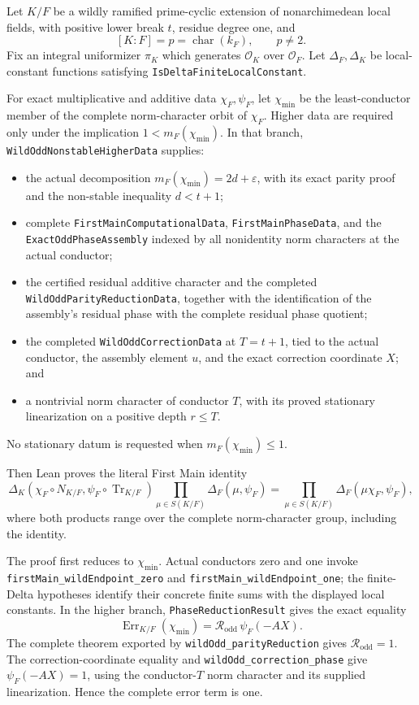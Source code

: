 \begin{theorem}\label{mod:cases-wildodd-main}
Let \(K/F\) be a wildly ramified prime-cyclic extension of
nonarchimedean local fields, with positive lower break \(t\), residue degree
one, and
\[
 [K:F]=p=\operatorname{char}(k_F),\qquad p\ne2.
\]
Fix an integral uniformizer \(\pi_K\) which generates
\(\mathcal O_K\) over \(\mathcal O_F\).  Let
\(\Delta_F,\Delta_K\) be local-constant functions satisfying
\texttt{IsDeltaFiniteLocalConstant}.

For exact multiplicative and additive data \(\chi_F,\psi_F\), let
\(\chi_{\min}\) be the least-conductor member of the complete
norm-character orbit of \(\chi_F\).  Higher data are required only under the
implication \(1<m_F(\chi_{\min})\).  In that branch,
\texttt{WildOddNonstableHigherData} supplies:
\begin{itemize}
\item the actual decomposition
  \(m_F(\chi_{\min})=2d+\varepsilon\), with its exact parity proof and the
  non-stable inequality \(d<t+1\);
\item complete \texttt{FirstMainComputationalData},
  \texttt{FirstMainPhaseData}, and the \texttt{ExactOddPhaseAssembly}
  indexed by all nonidentity norm characters at the actual conductor;
\item the certified residual additive character and the completed
  \texttt{WildOddParityReductionData}, together with the identification of
  the assembly's residual phase with the complete residual phase quotient;
\item the completed \texttt{WildOddCorrectionData} at \(T=t+1\), tied to
  the actual conductor, the assembly element \(u\), and the exact correction
  coordinate \(X\); and
\item a nontrivial norm character of conductor \(T\), with its proved
  stationary linearization on a positive depth \(r\le T\).
\end{itemize}
No stationary datum is requested when \(m_F(\chi_{\min})\le1\).

Then Lean proves the literal First Main identity
\[
 \Delta_K(\chi_F\circ N_{K/F},\psi_F\circ\operatorname{Tr}_{K/F})
 \prod_{\mu\in S(K/F)}\Delta_F(\mu,\psi_F)
 =
 \prod_{\mu\in S(K/F)}\Delta_F(\mu\chi_F,\psi_F),
\]
where both products range over the complete norm-character group, including
the identity.

The proof first reduces to \(\chi_{\min}\).  Actual conductors zero and one
invoke \texttt{firstMain\_wildEndpoint\_zero} and
\texttt{firstMain\_wildEndpoint\_one}; the finite-Delta hypotheses identify
their concrete finite sums with the displayed local constants.  In the
higher branch, \texttt{PhaseReductionResult} gives the exact equality
\[
 \operatorname{Err}_{K/F}(\chi_{\min})
 =\mathcal R_{\mathrm{odd}}\,\psi_F(-AX).
\]
The complete theorem exported by \texttt{wildOdd\_parityReduction} gives
\(\mathcal R_{\mathrm{odd}}=1\).  The correction-coordinate equality and
\texttt{wildOdd\_correction\_phase} give \(\psi_F(-AX)=1\), using the
conductor-\(T\) norm character and its supplied linearization.  Hence the
complete error term is one.


\end{theorem}
